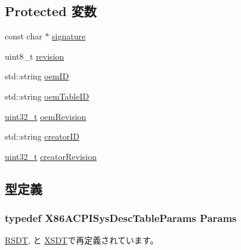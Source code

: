 \subsection*{Protected 変数}
\begin{DoxyCompactItemize}
\item 
const char $\ast$ \hyperlink{classX86ISA_1_1ACPI_1_1SysDescTable_a62a3efafff5619d2d9cc890932ca2a25}{signature}
\item 
uint8\_\-t \hyperlink{classX86ISA_1_1ACPI_1_1SysDescTable_ab01c6e281b316b1770d5646f3d3101c4}{revision}
\item 
std::string \hyperlink{classX86ISA_1_1ACPI_1_1SysDescTable_a6fbe7411ccf0e5a919c00e383ebc634b}{oemID}
\item 
std::string \hyperlink{classX86ISA_1_1ACPI_1_1SysDescTable_a4c0911676c41dce403ec0a9b89341540}{oemTableID}
\item 
\hyperlink{Type_8hh_a435d1572bf3f880d55459d9805097f62}{uint32\_\-t} \hyperlink{classX86ISA_1_1ACPI_1_1SysDescTable_a0ba60677762d0dc9099f9a4c806a05bf}{oemRevision}
\item 
std::string \hyperlink{classX86ISA_1_1ACPI_1_1SysDescTable_a32161466af077e34b8083b5f1a1d0efa}{creatorID}
\item 
\hyperlink{Type_8hh_a435d1572bf3f880d55459d9805097f62}{uint32\_\-t} \hyperlink{classX86ISA_1_1ACPI_1_1SysDescTable_a8f24ce73010815f85b7db67fc60ad6a1}{creatorRevision}
\end{DoxyCompactItemize}


\subsection{型定義}
\hypertarget{classX86ISA_1_1ACPI_1_1SysDescTable_ad7d44b54d0c12bc9cfd0eea8156c47ba}{
\subsubsection[{Params}]{\setlength{\rightskip}{0pt plus 5cm}typedef X86ACPISysDescTableParams {\bf Params}}}
\label{classX86ISA_1_1ACPI_1_1SysDescTable_ad7d44b54d0c12bc9cfd0eea8156c47ba}


\hyperlink{classX86ISA_1_1ACPI_1_1RSDT_a1a611568d222cb930a3203f6cceb698a}{RSDT}, と \hyperlink{classX86ISA_1_1ACPI_1_1XSDT_aeeb796d6a93a3929cdfc26a772c5cf1a}{XSDT}で再定義されています。

